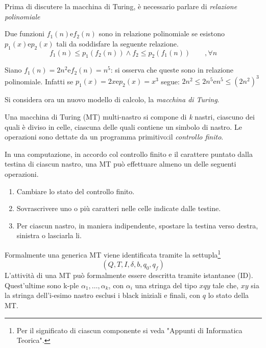 \documentclass{subfiles}
\begin{document}
Prima di discutere la macchina di Turing, è necessario parlare di \emph{relazione polinomiale}
\begin{Definition*}
    Due funzioni \(f_{1}(n) \text{e} f_{2}(n)\) sono in relazione polinomiale se esistono \(p_{1}(x) \text{e} p_{2}(x)\) tali da soddisfare la seguente relazione.
    \[
        f_{1}(n) \le p_{1}(f_{2}(n)) \land f_{2} \le p_{2}(f_{1}(n)) \qquad , \forall n
    \]
    \begin{Example*}
        Siano \(f_{1}(n) = 2n^{2} \text{e} f_{2}(n) = n^{5}\): si osserva che queste sono in relazione polinomiale.
        Infatti se \(p_{1}(x) = 2x \text{e} p_{2}(x) = x^{3}\) segue: \(2n^{2} \le 2n^{5} \text{e} n^{5} \le (2n^{2})^{3}\)
    \end{Example*}
\end{Definition*}

Si considera ora un nuovo modello di calcolo, la \emph{macchina di Turing}.

\begin{Definition*}
    Una macchina di Turing (MT) multi-nastro si compone di \emph{k} nastri, ciascuno dei quali è diviso in celle, ciascuna delle quali contiene un simbolo di nastro.
    Le operazioni sono dettate da un programma primitivo:il \emph{controllo finito}.
\end{Definition*}

\noindent In una computazione, in accordo col controllo finito e il carattere puntato dalla testina di ciascun nastro, una MT può effettuare almeno un delle seguenti operazioni.
\begin{enumerate}
    \item Cambiare lo stato del controllo finito.
    \item Sovrascrivere uno o più caratteri nelle celle indicate dalle testine.
    \item Per ciascun nastro, in maniera indipendente, spostare la testina verso destra, sinistra o lasciarla li.
\end{enumerate}

Formalmente una generica MT viene identificata tramite la settupla\footnote[4]{Per il significato di ciascun componente si veda "Appunti di Informatica Teorica".}
\[
    (Q, T, I, \delta, b, q_{0}, q_{f})
\]
L'attività di una MT può formalmente essere descritta tramite istantanee (ID). Quest'ultime sono k-ple \(\alpha_{1}, \ldots, \alpha_{k}\),
con \(\alpha_{i}\) una stringa del tipo \(xqy\) tale che, \(xy\) sia la stringa dell'i-esimo nastro esclusi i black iniziali e finali, con \(q\) lo stato della MT.
\end{document}
